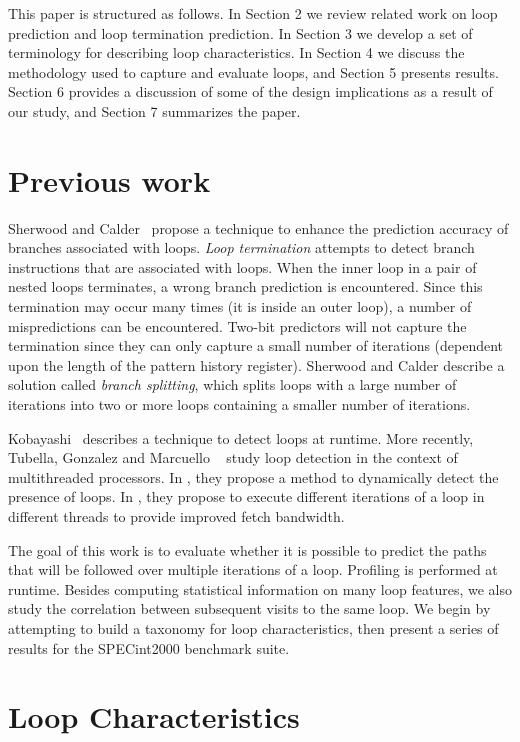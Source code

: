 \documentclass[times,10pt,twocolumn]{article}
\begin{document}
This paper is structured as follows.  In Section 2 we review related work
on loop prediction and loop termination prediction.  In Section 3 we develop
a set of terminology for describing loop characteristics.  In Section 4
we discuss the methodology used to capture and evaluate
loops, and Section 5 presents results.  Section 6 provides a discussion
of some of the design implications as a result of our study,
and Section 7 summarizes the paper.

\section {Previous work}	
Sherwood and Calder~\cite{She00} propose a technique to enhance the 
prediction accuracy 
of branches associated with loops.  {\it Loop termination} attempts
to detect branch instructions that are associated with loops.  When 
the inner loop in a pair of nested loops terminates, a wrong branch prediction
is encountered.  Since this termination may occur many times (it is inside
an outer loop), a number of mispredictions can be encountered.  Two-bit predictors
will not capture the termination since they can only capture a small number
of iterations (dependent upon the length of the pattern history register).  
Sherwood and Calder describe a solution called 
{\it branch splitting}, which splits loops with a large number of 
iterations into two or more loops containing a smaller number of iterations.

Kobayashi~\cite{Kob84} describes a technique to detect loops at runtime.
More recently, Tubella, Gonzalez and Marcuello
~\cite{gonz-dependence,Tub98} study loop detection 
in the context of multithreaded processors.
In \cite{Tub98}, they propose a 
method to dynamically detect the presence of loops.   
In \cite{gonz-dependence}, they propose 
to execute different iterations of a loop in 
different threads to provide improved fetch bandwidth.       

The goal of this work is to evaluate whether it is possible
to predict the paths that will be followed over multiple 
iterations of a loop.  Profiling is performed at runtime.  
Besides computing statistical information on many loop features, 
we also study the correlation between subsequent visits to the same loop.
We begin by attempting to build a taxonomy for loop characteristics,
then present a series of results for the SPECint2000 benchmark suite.
 
\section{Loop Characteristics}
\end{document}

